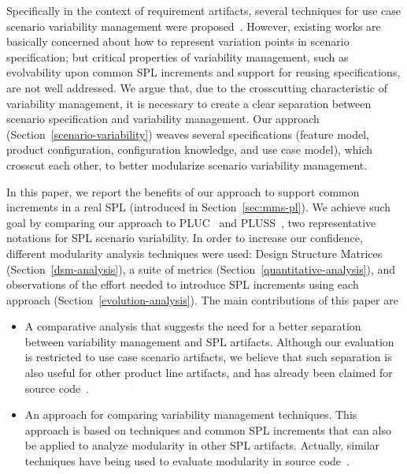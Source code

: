 \documentclass{acm_proc_article-sp}
\begin{document}
Specifically in the context of requirement artifacts, several techniques for use case scenario variability management were proposed~\cite{favaro-icsr-98,bertolino-esec-2003,fantechi-splc-2004,eriksson-splc-2005}. However, existing works are basically concerned about how to represent variation points in scenario specification; but critical properties of variability management, such as evolvability upon common SPL increments and support for reusing specifications, are not well addressed. We argue that, due to the crosscutting characteristic of variability management, it is necessary to create a clear separation between scenario specification and variability management. Our approach (Section~\ref{scenario-variability}) weaves several specifications (feature model, product configuration, configuration knowledge, and use case model), which crosscut each other, to better modularize scenario variability management. 

In this paper, we report the benefits of our approach to support common increments in a real SPL (introduced in Section~\ref{sec:mms-pl}). We achieve such goal by comparing our approach to PLUC~\cite{bertolino-esec-2003} and PLUSS~\cite{eriksson-splc-2005}, two representative notations for SPL scenario variability. In order to increase our confidence, different modularity analysis techniques were used: Design Structure Matrices (Section~\ref{dsm-analysis}), a suite of metrics (Section~\ref{quantitative-analysis}), and observations of the effort needed to introduce SPL increments using each approach (Section~\ref{evolution-analysis}). The main contributions of this paper are

\begin{itemize}
\item A comparative analysis that suggests the need for a better separation between variability management and SPL artifacts. Although our evaluation is restricted to use case scenario artifacts, we believe that such separation is also useful for other product line artifacts, and has already been claimed for source code~\cite{alves-gpce-06,mmedeiros-lawasp-2007}.

\item An approach for comparing variability management techniques. This approach is based on techniques and common SPL increments that can also be applied to analyze modularity in other SPL artifacts. Actually, similar techniques have being used to evaluate modularity in source code~\cite{vlopes-aosd-2005, sullivan-fse-2005,garcia-taosd-2005, greenwood-ecoop-2007}.   

\end{itemize}
\end{document}
